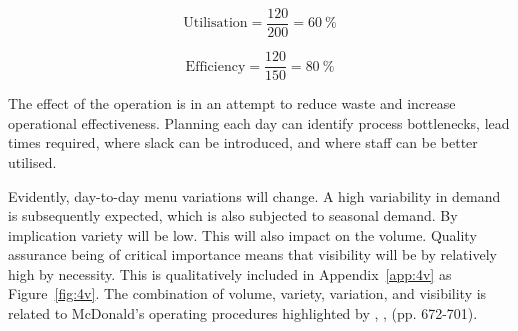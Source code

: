 \begin{equation}
\text{Utilisation} = \frac{120}{200} = 60~\%
\label{eq:uti}
\end{equation}

\begin{equation}
\text{Efficiency} = \frac{120}{150} = 80~\%    
\label{eq:eff}
\end{equation}

The effect of the operation is in an attempt to reduce waste and increase operational effectiveness. Planning each day can identify process bottlenecks, lead times required, where slack can be introduced, and where staff can be better utilised.

Evidently, day-to-day menu variations will change. A high variability in demand is subsequently expected, which is also subjected to seasonal demand. By implication variety will be low. This will also impact on the volume. Quality assurance being of critical importance means that visibility will be by relatively high by necessity. This is qualitatively included in Appendix~\ref{app:4v} as Figure~\ref{fig:4v}. The combination of volume, variety, variation, and visibility is related to McDonald's operating procedures highlighted by \citeauthor{mcdonalds}, \citeyear{mcdonalds}, (pp. 672-701).

\label{sec:ops3}
